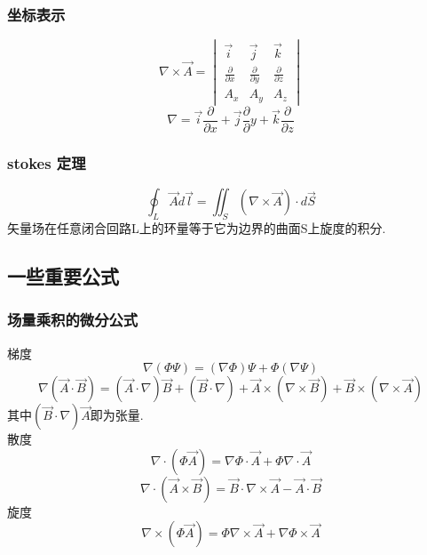 \subsubsection{坐标表示}
\begin{equation}\label{VecAnl_eq12}
\nabla \times \vec{A}=
\begin{vmatrix}
\vec{i} & \vec{j} & \vec{k} \\
\frac{\partial}{\partial x} & \frac{\partial}{\partial y} & \frac{\partial}{\partial z}\\
A_x & A_y & A_z
\end{vmatrix}
\end{equation}
\begin{equation}\label{VecAnl_eq13}
\nabla = \vec{i}\frac{\partial}{\partial x}+ \vec{j} \frac{\partial}{\partial}y + \vec{k} \frac{\partial}{\partial z}
\end{equation}

\subsubsection{stokes 定理}
\begin{equation}\label{VecAnl_eq14}
\oint_L \vec{A} d\vec{l}=\iint_S (\nabla \times \vec{A})\cdot d\vec{S}
\end{equation}
矢量场在任意闭合回路L上的环量等于它为边界的曲面S上旋度的积分.

\subsection{一些重要公式}
\subsubsection{场量乘积的微分公式}
梯度
\begin{equation}\label{VecAnl_eq15}
\nabla(\Phi \Psi)=(\nabla \Phi)\Psi+\Phi(\nabla \Psi)
\end{equation}
\begin{equation}\label{VecAnl_eq16}
\nabla(\vec{A} \cdot \vec{B})=(\vec{A} \cdot \nabla)\vec{B}+(\vec{B}\cdot\nabla)+\vec{A}\times(\nabla \times \vec{B})+\vec{B}\times(\nabla \times \vec{A})
\end{equation}
其中$(\vec{B}\cdot\nabla)\vec{A}$即为张量.\\
散度\\
\begin{equation}\label{VecAnl_eq17}
\nabla\cdot(\Phi\vec{A})=\nabla\Phi\cdot\vec{A}+\Phi\nabla\cdot\vec{A}
\end{equation}
\begin{equation}\label{VecAnl_eq18}
\nabla\cdot(\vec{A}\times\vec{B})=\vec{B}\cdot\nabla\times\vec{A}-\vec{A}\cdot\vec{B}
\end{equation}
旋度\\
\begin{equation}\label{VecAnl_eq19}
\nabla\times(\Phi\vec{A})=\Phi\nabla\times\vec{A}+\nabla\Phi\times\vec{A}
\end{equation}

